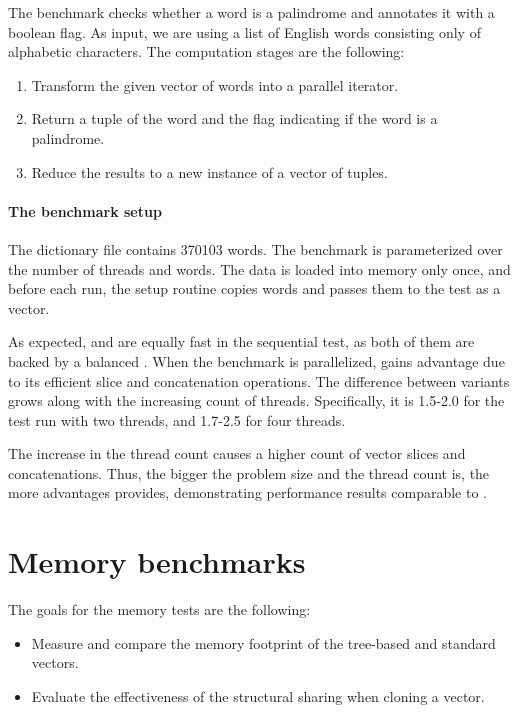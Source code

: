 The benchmark checks whether a word is a palindrome and annotates it with a boolean flag. As input, we are using a list of English words consisting only of alphabetic characters. The computation stages are the following:

\begin{enumerate}
    \item Transform the given vector of words into a parallel iterator.
    \item Return a tuple of the word and the flag indicating if the word is a palindrome.
    \item Reduce the results to a new instance of a vector of tuples.
\end{enumerate}

\paragraph{The benchmark setup}
The dictionary file contains 370103 words. The benchmark is parameterized over the number of threads and words. The data is loaded into memory only once, and before each run, the setup routine copies \n{} words and passes them to the test as a vector.

As expected, \rbvec{} and \rrbvec{} are equally fast in the sequential test, as both of them are backed by a balanced \rbtree{}. When the benchmark is parallelized, \rrbvec{} gains advantage due to its efficient slice and concatenation operations. The difference between variants grows along with the increasing count of threads. Specifically, it is 1.5-2.0 for the test run with two threads, and 1.7-2.5 for four threads.

The increase in the thread count causes a higher count of vector slices and concatenations. Thus, the bigger the problem size and the thread count is, the more advantages \rrbvec{} provides, demonstrating performance results comparable to \stdvec{}.

\section{Memory benchmarks}
The goals for the memory tests are the following:
\begin{itemize}
    \item Measure and compare the memory footprint of the tree-based and standard vectors.
    \item Evaluate the effectiveness of the structural sharing when cloning a vector.
\end{itemize}

